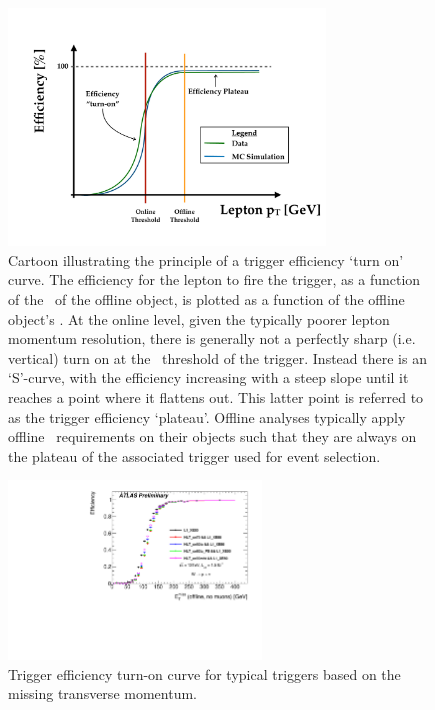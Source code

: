 \begin{figure}[!htb]
    \begin{center}
        \includegraphics[width=0.75\textwidth]{figures/common_ana/trig_plateauPDF}
        \caption{
            Cartoon illustrating the principle of a trigger efficiency `turn on' curve.
            The efficiency for the lepton to fire the trigger, as a function of the \pT~of the offline object, is plotted
            as a function of the offline object's \pT.
            At the online level, given the typically poorer lepton momentum resolution, there is generally
            not a perfectly sharp (i.e. vertical) turn on at the \pT~threshold of the trigger.
            Instead there is an `S'-curve, with the efficiency increasing with a steep slope
            until it reaches a point where it flattens out.
            This latter point is referred to as the trigger efficiency `plateau'.
            Offline analyses typically apply offline \pT~requirements on their objects
            such that they are always on the plateau of the associated trigger used for event selection.
        }
        \label{fig:trig_plateau_cartoon}
    \end{center}
\end{figure}

\begin{figure}[!htb]
    \begin{center}
        \includegraphics[width=0.6\textwidth]{figures/common_ana/trig/met_trig_example}
        \caption{
            Trigger efficiency turn-on curve for typical triggers based on the missing transverse momentum.
        }
        \label{fig:met_trig_example}
    \end{center}
\end{figure}

